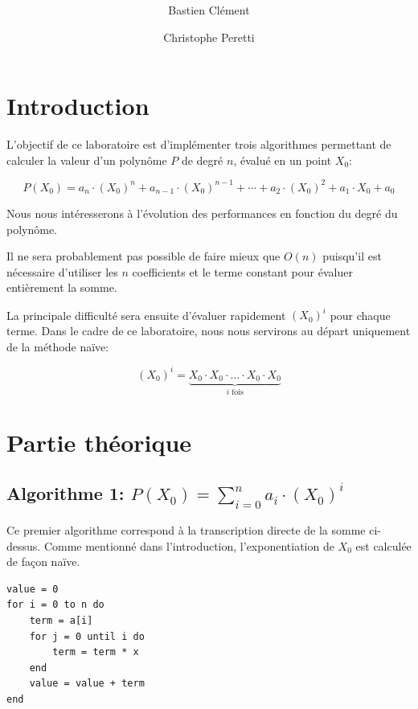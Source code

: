 \documentclass[11pt,a4paper]{article}
\author{Bastien Clément \and Christophe Peretti}
\title{{\normalsize \doccourse} \\ \doctitle }
\begin{document}
\maketitle
\vspace{1em}

\section{Introduction}

L'objectif de ce laboratoire est d'implémenter trois algorithmes permettant de calculer la valeur d'un polynôme $P$ de degré $n$, évalué en un point $X_{0}$:

\[
	P(X_{0})
		= a_{n} \cdot (X_{0})^{n}
		+ a_{n-1} \cdot (X_{0})^{n-1}
		+ \cdots
		+ a_{2} \cdot (X_{0})^{2}
		+ a_{1} \cdot X_{0}
		+ a_{0}
\]

Nous nous intéresserons à l'évolution des performances en fonction du degré du polynôme.

Il ne sera probablement pas possible de faire mieux que $O(n)$ puisqu'il est nécessaire d'utiliser les $n$ coefficients et le terme constant pour évaluer entièrement la somme.

La principale difficulté sera ensuite d'évaluer rapidement $(X_{0})^{i}$ pour chaque terme. Dans le cadre de ce laboratoire, nous nous servirons au départ uniquement de la méthode naïve:

\[
	(X_{0})^{i} = \underbrace{X_{0} \cdot X_{0} \cdot \ldots \cdot X_{0} \cdot X_{0}}_{i \text{ fois}}
\]


\section{Partie théorique}

\subsection{Algorithme 1: $ P(X_{0}) = \sum\limits_{i=0}^{n} a_{i} \cdot (X_{0})^{i} $}

Ce premier algorithme correspond à la transcription directe de la somme ci-dessus. Comme mentionné dans l'introduction, l'exponentiation de $X_{0}$ est calculée de façon naïve.

\vspace{1em} \begin{lstlisting}
value = 0
for i = 0 to n do
	term = a[i]
	for j = 0 until i do
		term = term * x
	end
	value = value + term
end
\end{lstlisting}
\end{document}
